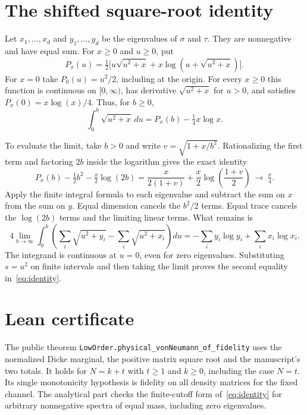 \documentclass[11pt,a4paper]{article}
\begin{document}
\newpage
\section*{The shifted square-root identity}
Let $x_1,\ldots,x_d$ and $y_1,\ldots,y_d$ be the eigenvalues of $\sigma$ and $\tau$.
They are nonnegative and have equal sum. For $x\ge0$ and $u\ge0$, put
\[
 P_x(u)=\tfrac12\bigl[u\sqrt{u^2+x}
                   + x\log(u+\sqrt{u^2+x})\bigr].
\]
For $x=0$ take $P_0(u)=u^2/2$, including at the origin. For every $x\ge0$ this function is continuous on $[0,\infty)$, has derivative $\sqrt{u^2+x}$ for $u>0$, and satisfies $P_x(0)=x\log(x)/4$. Thus, for $b\ge0$,
\[
 \int_0^b\sqrt{u^2+x}\,du=P_x(b)-\tfrac14 x\log x.
\]

To evaluate the limit, take $b>0$ and write $v=\sqrt{1+x/b^2}$. Rationalizing the first term and factoring $2b$ inside the logarithm gives the exact identity
\[
 P_x(b)-\tfrac12 b^2-\tfrac x2\log(2b)
       =\frac{x}{2(1+v)}+\frac x2\log\!\left(\frac{1+v}{2}\right)
       \ \longrightarrow\ \tfrac x4 .
\]
Apply the finite integral formula to each eigenvalue and subtract the sum on $x$ from the sum on $y$. Equal dimension cancels the $b^2/2$ terms. Equal trace cancels the $\log(2b)$ terms and the limiting linear terms. What remains is
\[
 4\lim_{b\to\infty}\int_0^b
     \left(\sum_i\sqrt{u^2+y_i}-\sum_i\sqrt{u^2+x_i}\right)du
 =-\sum_i y_i\log y_i+\sum_i x_i\log x_i .
\]
The integrand is continuous at $u=0$, even for zero eigenvalues. Substituting $s=u^2$ on finite intervals and then taking the limit proves the second equality in~\eqref{eq:identity}.

\section*{Lean certificate}
The public theorem \texttt{LowOrder.physical\_vonNeumann\_of\_fidelity} uses
the normalized Dicke marginal, the positive matrix square root and the manuscript's two totals. It holds for $N=k+t$ with $t\ge1$ and $k\ge0$, including the case $N=t$. Its single monotonicity hypothesis is fidelity on all density matrices for the fixed channel. The analytical part checks the finite-cutoff form of~\eqref{eq:identity} for arbitrary nonnegative spectra of equal mass, including zero eigenvalues.
\end{document}
